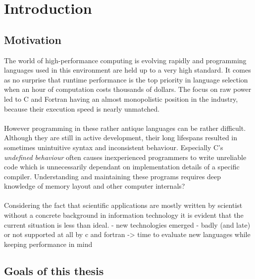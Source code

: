 \chapter{Introduction}
\label{chap:Introduction}


\section{Motivation}
\label{sec:Motivation}

The world of high-performance computing is evolving rapidly and programming languages used in this environment are held up to a very high standard. It comes as no surprise that runtime performance is the top priority in language selection when an hour of computation costs thousands of dollars. The focus on raw power led to C and Fortran having an almost monopolistic position in the industry, because their execution speed is nearly unmatched.
\\ \\
However programming in these rather antique languages can be rather difficult. Although they are still in active development, their long lifespans resulted in sometimes unintuitive syntax and inconsistent behaviour. Especially C's \textit{undefined behaviour} often causes inexperienced programmers to write unreliable code which is unnecessarily dependant on implementation details of a specific compiler. Understanding and maintaining these programs requires deep knowledge of memory layout and other computer internals?
\\ \\
Considering the fact that scientific applications are mostly written by scientist without a concrete background in information technology it is evident that the current situation is less than ideal.
- new technologies emerged
    - badly (and late) or not supported at all by c and fortran
    -> time to evaluate new languages while keeping performance in mind

\section{Goals of this thesis}
\label{sec:Goals}

